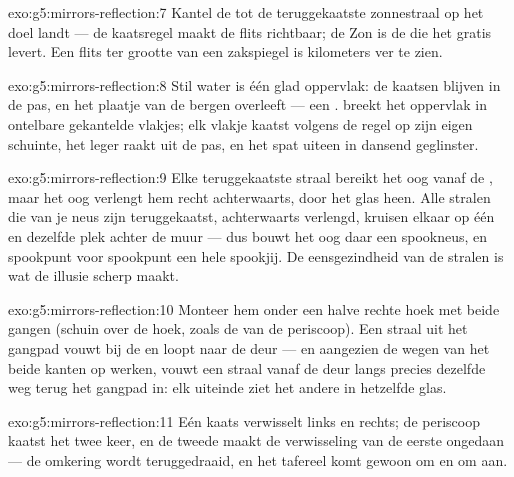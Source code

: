 \begin{solution}{exo:g5:mirrors-reflection:7}
Kantel de  tot de teruggekaatste zonnestraal op het doel landt
--- de kaatsregel maakt de flits richtbaar; de Zon is de
 die het  gratis levert. Een flits ter grootte
van een zakspiegel is kilometers ver te zien.
\end{solution}

\begin{solution}{exo:g5:mirrors-reflection:8}
Stil water is één glad oppervlak: de kaatsen blijven in de pas, en het
plaatje van de bergen overleeft --- een .  breekt het
oppervlak in ontelbare gekantelde vlakjes; elk vlakje kaatst volgens
de regel op zijn eigen schuinte, het leger raakt uit de pas, en het
 spat uiteen in dansend geglinster.
\end{solution}

\begin{solution}{exo:g5:mirrors-reflection:9}
Elke teruggekaatste straal bereikt het oog vanaf de , maar het
oog verlengt hem recht achterwaarts, door het glas heen. Alle stralen
die van je neus zijn teruggekaatst, achterwaarts verlengd, kruisen
elkaar op één en dezelfde plek achter de muur --- dus bouwt het oog
daar een spookneus, en spookpunt voor spookpunt een hele spookjij. De
eensgezindheid van de stralen is wat de illusie scherp maakt.
\end{solution}

\begin{solution}{exo:g5:mirrors-reflection:10}
Monteer hem onder een halve rechte hoek met beide gangen (schuin over
de hoek, zoals de  van de periscoop). Een straal uit het
gangpad vouwt bij de  en loopt naar de deur --- en aangezien de
wegen van het  beide kanten op werken, vouwt een straal vanaf de
deur langs precies dezelfde weg terug het gangpad in: elk uiteinde
ziet het andere in hetzelfde glas.
\end{solution}

\begin{solution}{exo:g5:mirrors-reflection:11}
Eén kaats verwisselt links en rechts; de periscoop kaatst het
 twee keer, en de tweede  maakt de verwisseling van
de eerste ongedaan --- de omkering wordt teruggedraaid, en het
tafereel komt gewoon om en om aan.
\end{solution}
